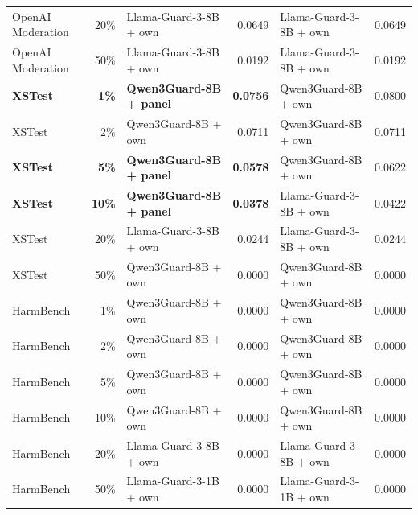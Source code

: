 \documentclass[11pt]{article}
\begin{document}
\begin{table}[ht]
{\begin{tabular}{lrlrlr}
OpenAI Moderation & 20\% & Llama-Guard-3-8B + own & 0.0649 & Llama-Guard-3-8B + own & 0.0649 \\
OpenAI Moderation & 50\% & Llama-Guard-3-8B + own & 0.0192 & Llama-Guard-3-8B + own & 0.0192 \\
\midrule
\textbf{XSTest} & \textbf{1\%} & \textbf{Qwen3Guard-8B + panel} & \textbf{0.0756} & Qwen3Guard-8B + own & 0.0800 \\
XSTest & 2\% & Qwen3Guard-8B + own & 0.0711 & Qwen3Guard-8B + own & 0.0711 \\
\textbf{XSTest} & \textbf{5\%} & \textbf{Qwen3Guard-8B + panel} & \textbf{0.0578} & Qwen3Guard-8B + own & 0.0622 \\
\textbf{XSTest} & \textbf{10\%} & \textbf{Qwen3Guard-8B + panel} & \textbf{0.0378} & Llama-Guard-3-8B + own & 0.0422 \\
XSTest & 20\% & Llama-Guard-3-8B + own & 0.0244 & Llama-Guard-3-8B + own & 0.0244 \\
XSTest & 50\% & Qwen3Guard-8B + own & 0.0000 & Qwen3Guard-8B + own & 0.0000 \\
\midrule
HarmBench & 1\% & Qwen3Guard-8B + own & 0.0000 & Qwen3Guard-8B + own & 0.0000 \\
HarmBench & 2\% & Qwen3Guard-8B + own & 0.0000 & Qwen3Guard-8B + own & 0.0000 \\
HarmBench & 5\% & Qwen3Guard-8B + own & 0.0000 & Qwen3Guard-8B + own & 0.0000 \\
HarmBench & 10\% & Qwen3Guard-8B + own & 0.0000 & Qwen3Guard-8B + own & 0.0000 \\
HarmBench & 20\% & Llama-Guard-3-8B + own & 0.0000 & Llama-Guard-3-8B + own & 0.0000 \\
HarmBench & 50\% & Llama-Guard-3-1B + own & 0.0000 & Llama-Guard-3-1B + own & 0.0000 \\
\bottomrule
\end{tabular}%
}
\end{table}
\end{document}
